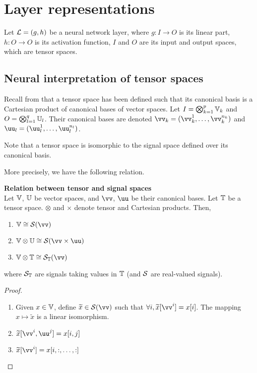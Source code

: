 \section{Layer representations}
\label{sec:rep}

Let $\mathcal{L} = (g,h)$ be a neural network layer, where $g: I \rightarrow O$ is its linear part, $h : O \rightarrow O$ is its activation function, $I$ and $O$ are its input and output spaces, which are tensor spaces. 

\subsection{Neural interpretation of tensor spaces}

Recall from  that a tensor space has been defined such that its canonical basis is a Cartesian product of canonical bases of vector spaces. Let $I = \bigotimes_{k=1}^p \mathbb{V}_k$ and $O =  \bigotimes_{l=1}^q \mathbb{U}_l$.
Their canonical bases are denoted $\vv_k = (\vv_k^1, \ldots, \vv_k^{n_k})$ and $\uu_l = (\uu_l^1, \ldots, \uu_l^{n_l})$.

\begin{remark}
Note that a tensor space is isomorphic to the signal space defined over its canonical basis.
\end{remark}

More precisely, we have the following relation.

\begin{lemma}\textbf{Relation between tensor and signal spaces}\\
Let $\mathbb{V}$, $\mathbb{U}$ be vector spaces, and $\vv$, $\uu$ be their canonical bases. Let $\mathbb{T}$ be a tensor space. $\otimes$ and $\times$ denote tensor and Cartesian products. Then,
\begin{enumerate}[label=(\roman*)]
  \item $\bbv \cong \cs(\vv)$
  \item $\bbv \otimes \bbu \cong \cs(\vv \times \uu)$
  \item $\bbv \otimes \bbt \cong \cs_{\bbt}(\vv)$
\end{enumerate}
where $\mathcal{S}_{\mathbb{T}}$ are signals taking values in $\mathbb{T}$ (and $\mathcal{S}$ are real-valued signals).
\label{lem:relts}
\end{lemma}
\begin{proof}
\begin{enumerate}[label=(\roman*)]
  \item Given $x \in \mathbb{V}$, define $\widetilde{x} \in \cs(\vv)$ such that $\forall i, \widetilde{x}[\vv^i] = x[i]$. The mapping $x \mapsto \widetilde{x}$ is a linear isomorphism. \label{enum:li}
  \item $\widetilde{x}[\vv^i, \uu^j] = x[i,j]$
  \item $\widetilde{x}[\vv^i] = x[i,:,\ldots,:]$
\end{enumerate}
\end{proof}

